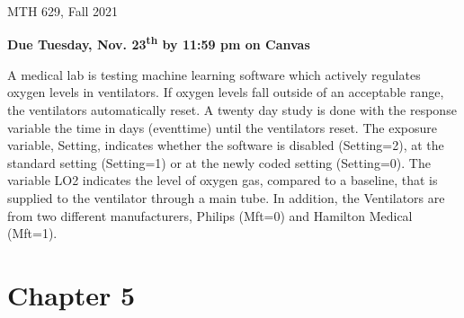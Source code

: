 \documentclass[12pt]{article}
\begin{document}
{
            \hfill {MTH 629, Fall 2021}}
\bigskip

{\bf Due Tuesday, Nov. 23\textsuperscript{th} by 11:59 pm on Canvas}

A medical lab is testing machine learning software which actively regulates oxygen levels in ventilators. If oxygen levels fall outside of an acceptable range, the ventilators automatically reset. A twenty day study is done with the response variable the time in days (eventtime) until the ventilators reset. The exposure variable, Setting, indicates whether the software is disabled (Setting=2), at the standard setting (Setting=1) or at the newly coded setting (Setting=0). The variable LO2 indicates the level of oxygen gas, compared to a baseline, that is supplied to the ventilator through a main tube. In addition, the Ventilators are from two different manufacturers, Philips (Mft=0) and Hamilton Medical (Mft=1).


\section{Chapter 5}
\end{document}
